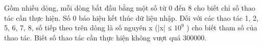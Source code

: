 Gồm nhiều dòng, mỗi dòng bắt đầu bằng một số từ 0 đến 8 cho biết chỉ số thao tác cần thực hiện. Số 0 báo hiệu kết thúc dữ liệu nhập. Đối với các thao tác 1, 2, 5, 6, 7, 8, số tiếp theo trên dòng là số nguyên x (|x| ≤ $10^{9}$   ) cho biết tham số của thao tác. Biết số thao tác cần thực hiện không vượt quá 300000.